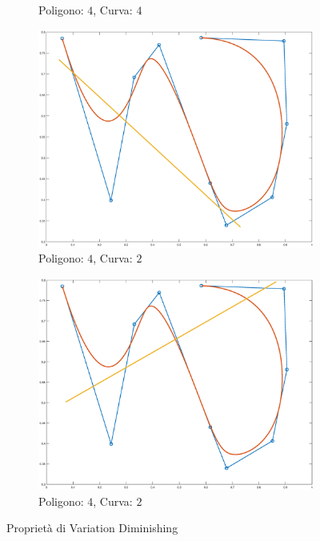 \documentclass[a4paper, 10pt]{article}
\begin{document}
\begin{figure}[]
\begin{subfigure}[b]{0.3\textwidth}
      \caption{Poligono: $4$, Curva: $4$}
      \label{fig:intersection3}
  \end{subfigure}
  \begin{subfigure}[b]{0.3\textwidth}
      \includegraphics[width=\textwidth]{figure/intersection4.eps}
      \caption{Poligono: $4$, Curva: $2$}
      \label{fig:intersection4}
  \end{subfigure}
  \begin{subfigure}[b]{0.3\textwidth}
    \includegraphics[width=\textwidth]{figure/intersection5.eps}
    \caption{Poligono: $4$, Curva: $2$}
    \label{fig:intersection5}
  \end{subfigure}
  \caption{Proprietà di Variation Diminishing}\label{fig:intersection}
\end{figure}
\end{document}
